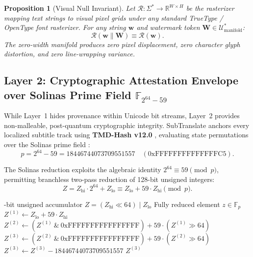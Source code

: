 \documentclass[11pt,a4paper,reqno]{article}
\newtheorem{proposition}[theorem]{Proposition}
\theoremstyle{definition}
\theoremstyle{remark}
\begin{document}
\begin{proposition}[Visual Null Invariant]
Let $\mathcal{R}: \Sigma^* \to \mathbb{R}^{W \times H}$ be the rasterizer mapping text strings to visual pixel grids under any standard TrueType / OpenType font rasterizer. For any string $\mathbf{w}$ and watermark token $\mathbf{W} \in \mathcal{U}_{\text{manifold}}^*$:
\begin{equation}
\mathcal{R}(\mathbf{w} \parallel \mathbf{W}) \equiv \mathcal{R}(\mathbf{w}).
\end{equation}
The zero-width manifold produces zero pixel displacement, zero character glyph distortion, and zero line-wrapping variance.
\end{proposition}

\subsection{Layer 2: Cryptographic Attestation Envelope over Solinas Prime Field $\mathbb{F}_{2^{64}-59}$}
While Layer~1 hides provenance within Unicode bit streams, Layer~2 provides non-malleable, post-quantum cryptographic integrity. SubTranslate anchors every localized subtitle track using \textbf{TMD-Hash v12.0} \cite{tmd_hash_v12}, evaluating state permutations over the Solinas prime field \cite{solinas_1999}:
\begin{equation}
p = 2^{64} - 59 = 18446744073709551557 \quad (0\mathrm{xFFFFFFFFFFFFFFC5}).
\end{equation}

The Solinas reduction exploits the algebraic identity $2^{64} \equiv 59 \pmod{p}$, permitting branchless two-pass reduction of 128-bit unsigned integers:
\begin{equation}
Z = Z_{\text{hi}} \cdot 2^{64} + Z_{\text{lo}} \equiv Z_{\text{lo}} + 59 \cdot Z_{\text{hi}} \pmod{p}.
\end{equation}

\begin{algorithm}[H]
\caption{Branchless Two-Pass Solinas Reduction over $\mathbb{F}_{2^{64}-59}$}
\label{alg:solinas_reduce}
\begin{algorithmic}[1]
-bit unsigned accumulator $Z = (Z_{\text{hi}} \ll 64) \mid Z_{\text{lo}}$
\Ensure Fully reduced element $z \in \mathbb{F}_p$
\State $Z^{(1)} \gets Z_{\text{lo}} + 59 \cdot Z_{\text{hi}}$
\State $Z^{(2)} \gets (Z^{(1)} \ \& \ \text{0xFFFFFFFFFFFFFFFF}) + 59 \cdot (Z^{(1)} \gg 64)$
\State $Z^{(3)} \gets (Z^{(2)} \ \& \ \text{0xFFFFFFFFFFFFFFFF}) + 59 \cdot (Z^{(2)} \gg 64)$
    \State $Z^{(3)} \gets Z^{(3)} - 18446744073709551557$
\EndIf
\State \Return $Z^{(3)}$
\end{algorithmic}
\end{algorithm}
\end{document}
